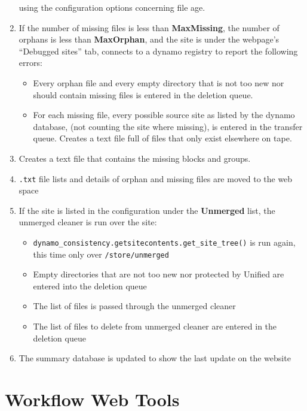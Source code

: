 \begin{enumerate}
  using the configuration options concerning file age.
\item If the number of missing files is less than {\bf MaxMissing},
  the number of orphans is less than {\bf MaxOrphan},
  and the site is under the webpage’s “Debugged sites” tab,
  connects to a dynamo registry to report the following errors:
  \begin{itemize}
  \item Every orphan file and every empty directory that is not too new
    nor should contain missing files is entered in the deletion queue.
  \item For each missing file, every possible source site as listed by the dynamo database,
    (not counting the site where missing), is entered in the transfer queue.
    Creates a text file full of files that only exist elsewhere on tape.
  \end{itemize}
\item Creates a text file that contains the missing blocks and groups.
\item \texttt{.txt} file lists and details of orphan and missing files are moved
  to the web space
\item If the site is listed in the configuration under the {\bf Unmerged} list,
  the unmerged cleaner is run over the site:
  \begin{itemize}
  \item \texttt{dynamo\_consistency.getsitecontents.get\_site\_tree()} is run again,
    this time only over \texttt{/store/unmerged}
  \item Empty directories that are not too new nor protected by Unified
    are entered into the deletion queue
  \item The list of files is passed through the unmerged cleaner
  \item The list of files to delete from unmerged cleaner
    are entered in the deletion queue
  \end{itemize}
\item The summary database is updated to show the last update on the website
\end{enumerate}

\section{Workflow Web Tools}
